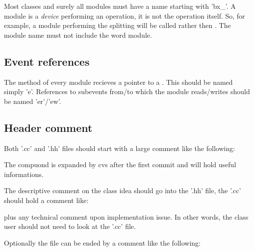 Most classes and surely all modules must have a name starting with 'bx\_'.
A module is a \emph{device} performing an operation, it is not the operation itself. So, for example, a module performing the splitting will be called  rather then .
The module name must not include the word module.


\subsection{Event references}

The  method of every module recieves a pointer to a . This should be named simply 'e'.
References to subevents from/to which the module reads/writes should be named 'er'/'ew'.


\subsection{Header comment}
Both '.cc' and '.hh' files should start with a large comment like the following:

\noindent{}

The compuond  is expanded by cvs after the first commit and will hold useful informations.

The descriptive comment on the class idea should go into the '.hh' file, the '.cc' should hold a comment like:


plus any technical comment upon implementation issue.
In other words, the class user should not need to look at the '.cc' file.

Optionally the file can be ended by a comment like the following:

